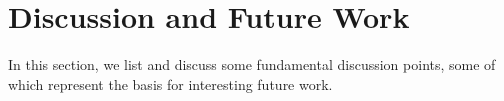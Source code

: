 {{%




\section{Discussion and Future Work}
\label{sec:Discussion}
In this section, we list and discuss some fundamental discussion points, some of which represent the basis for interesting future work. 
}}

